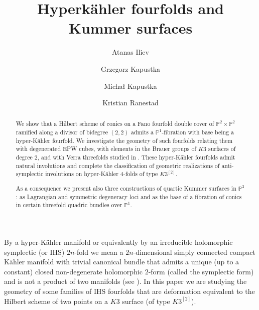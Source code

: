 \documentclass[a4paper,11pt]{amsart}
\theoremstyle{definition}
\numberwithin{equation}{section}
\numberwithin{equation}{section} \theoremstyle{definition}
\begin{document}
\title{Hyperk\"ahler fourfolds and Kummer surfaces} 

\author[A.~Iliev]{Atanas Iliev}
\address{Seoul National University, Department of Mathematics, Gwanak Campus, Bldg. 27, Seoul 151-747, Korea}
\author[G.~Kapustka]{Grzegorz Kapustka}
\address{Institut f\"ur Mathematik Mathematisch-naturwissenschaftliche Fakult\"at
Universit\"at Z\"urich, Winterthurerstrasse 190, CH-8057 Z\"urich}
\address{Institute of Mathematics of the Jagiellonian University, ul \L ojasiewicza 6 Krak\'ow, Poland}

\author[M.~Kapustka]{Micha\l{} Kapustka}
\address{University of  Stavanger, Department of Mathematics and Natural Sciences, NO-4036 Stavanger, Norway}
\address{Institute of Mathematics of the Jagiellonian University, ul \L ojasiewicza 6 Krak\'ow, Poland}
\author[K.~Ranestad]{Kristian Ranestad}
\address{University of Oslo, Department of Mathematics, PO Box 1053, Blindern, N-0316 Oslo, Norway}

\begin{abstract}
We show that a Hilbert scheme of conics on a Fano fourfold double cover of ${{\mathbb{P}}}^2\times{{\mathbb{P}}}^2$ ramified along a divisor of bidegree $(2,2)$ admits a ${{\mathbb{P}}}^1$-fibration with base being
a hyper-K\"{a}hler fourfold. We investigate the geometry of such fourfolds relating them with degenerated EPW cubes, with elements in the Brauer groups of $K3$ surfaces
of degree $2$, and with Verra threefolds studied in \cite{Vera}. 
These hyper-K\"{a}hler fourfolds admit natural involutions and complete the classification of geometric realizations
of anti-symplectic involutions on hyper-K\"{a}hler $4$-folds of type $K3^{[2]}$.

As a consequence we present also three constructions of quartic Kummer surfaces in ${{\mathbb{P}}}^3$: as Lagrangian and symmetric degeneracy loci and as the base of a fibration of conics in certain threefold quadric bundles over ${{\mathbb{P}}}^1$.
\end{abstract}

\maketitle
\tableofcontents
By a hyper-K\"{a}hler manifold or equivalently by an irreducible holomorphic symplectic  (or IHS) $2n$-fold we mean
a $2n$-dimensional simply connected compact K\"{a}hler manifold with trivial canonical
bundle that admits a unique (up to a constant)
closed non-degenerate holomorphic $2$-form (called the symplectic form) and is not a product of two
manifolds (see \cite{Beauville}). 
In this paper we are studying the geometry of some families of IHS fourfolds that are deformation equivalent to the Hilbert scheme of two points on a $K3$ surface (of type $K3^{[2]}$).
 
\end{document}
